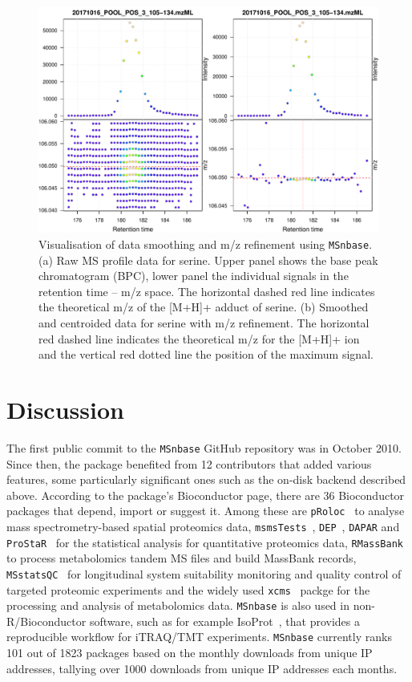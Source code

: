 \documentclass[journal=jacsat,manuscript=article]{achemso}\usepackage[]{graphicx}\usepackage[]{color}
\begin{document}
\begin{figure}
  \centering
  \includegraphics[width=\linewidth]{./figure/centroiding.pdf}
  \caption{Visualisation of data smoothing and m/z refinement using
    \texttt{MSnbase}. (a) Raw MS profile data for serine. Upper panel
    shows the base peak chromatogram (BPC), lower panel the individual
    signals in the retention time -- m/z space. The horizontal dashed
    red line indicates the theoretical m/z of the [M+H]+ adduct of
    serine. (b) Smoothed and centroided data for serine with m/z
    refinement. The horizontal red dashed line indicates the
    theoretical m/z for the [M+H]+ ion and the vertical red dotted
    line the position of the maximum signal. }
  \label{fig:cent}
\end{figure}

\section{Discussion}

The first public commit to the \texttt{MSnbase} GitHub repository was
in October 2010. Since then, the package benefited from 12
contributors\cite{contribs} that added various features, some
particularly significant ones such as the on-disk backend described
above. According to the package's Bioconductor page, there are 36
Bioconductor packages that depend, import or suggest it. Among these
are \texttt{pRoloc}~\cite{Gatto:2014a} to analyse mass
spectrometry-based spatial proteomics data,
\texttt{msmsTests}~\cite{msmsTests}, \texttt{DEP}~\cite{Zhang:2018},
\texttt{DAPAR} and \texttt{ProStaR}~\cite{Wieczorek:2017} for the
statistical analysis for quantitative proteomics data,
\texttt{RMassBank}~\cite{Stravs:2013} to process metabolomics tandem
MS files and build MassBank records,
\texttt{MSstatsQC}~\cite{Dogu:2017} for longitudinal system
suitability monitoring and quality control of targeted proteomic
experiments and the widely used \texttt{xcms}~\cite{Smith:2006} packge
for the processing and analysis of metabolomics data. \texttt{MSnbase}
is also used in non-R/Bioconductor software, such as for example
IsoProt~\cite{Griss:2019}, that provides a reproducible workflow for
iTRAQ/TMT experiments. \texttt{MSnbase} currently ranks 101 out of
1823 packages based on the monthly downloads from unique IP addresses,
tallying over 1000 downloads from unique IP addresses each months.
\end{document}

